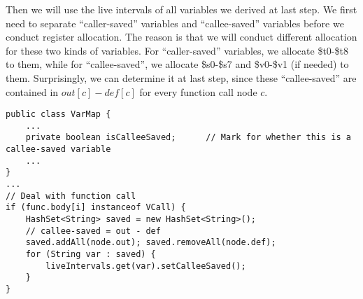 \documentclass[letterpaper, 14pt]{article}
\begin{document}
Then we will use the live intervals of all variables we derived at last step. We first need to separate ``caller-saved'' variables and ``callee-saved'' variables before we conduct register allocation. The reason is that we will conduct different allocation for these two kinds of variables. For ``caller-saved'' variables, we allocate \$t0-\$t8 to them, while for ``callee-saved'', we allocate \$s0-\$s7 and \$v0-\$v1 (if needed) to them. Surprisingly, we can determine it at last step, since these ``callee-saved'' are contained in $out[c]-def[c]$ for every function call node $c$. 
\begin{lstlisting}
public class VarMap {
	...
	private boolean isCalleeSaved;		// Mark for whether this is a callee-saved variable
	...
}
...
// Deal with function call
if (func.body[i] instanceof VCall) {
	HashSet<String> saved = new HashSet<String>();
	// callee-saved = out - def
	saved.addAll(node.out); saved.removeAll(node.def);
	for (String var : saved) {
		liveIntervals.get(var).setCalleeSaved();
	}
}
\end{lstlisting}
\end{document}
